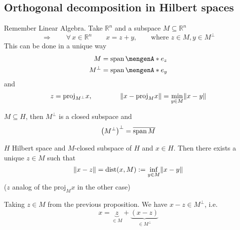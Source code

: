 \subsection{Orthogonal decomposition in Hilbert spaces} 
\label{sub:orthogonal_decomposition_in_hilber_spaces}

Remember Linear Algebra. Take $\mathbb{R}^n$ and a subspace $M \subseteq \mathbb{R}^n$ 
\[
	\Rightarrow \qquad \forall\, x \in \mathbb{R}^n \qquad x = z + y, \qquad \text{where }z \in M, y \in M^{\perp}
\]
This can be done in a unique way
\begin{align*}
	M &= \spn \set{e_z} \\ 
	M^{\perp} &= \spn\set{e_y}
\end{align*}
and
\[
	z = \text{proj}_{M^{\perp}}x, \qquad \qquad \norm{x - \text{proj}_Mx} = \min_{y \in M}\norm{x-y}
\]


\begin{proposition}
	$M \subseteq H$, then $M^{\perp}$ is a closed subspace and
	\[
		\left( M^{\perp} \right)^{\perp} = \overline{\operatorname{span} M}
	\]
\end{proposition}

\begin{satz}
	$H$ Hilbert space and $M$-closed subspace of $H$ and $x \in H$. Then there exists a unique $z \in M$ such that
	\[
		\norm{x-z} = \dist(x,M) := \inf_{y \in M} \norm{x-y}
	\]
	($z$ analog of the $\text{proj}_Mx$ in the other case)
\end{satz}

\begin{proposition}
	Taking $z \in M$ from the previous proposition. We have $x - z \in M^{\perp}$, i.e.
	\[
		x = \underset{\in M}{\underbrace{z}} + \underset{\in M^{\perp}}{\underbrace{(x - z)}}
	\]
\end{proposition}